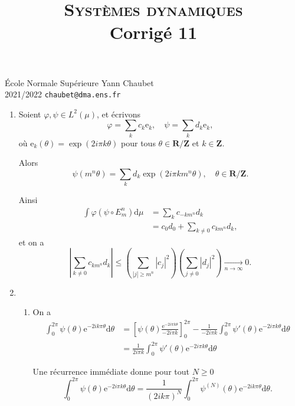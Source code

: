 \documentclass[a4paper,12pt,openany]{article}
\title{\textsc{Syst\`emes dynamiques} \\ Corrig\'e 11}
\date{}
\author{}
\theoremstyle{plain}
\theoremstyle{definition}
\newcommand{\e}{\mathrm{e}}
\newcommand{\dd}{\mathrm{d}}
\newcommand{\R}{\mathbf{R}}
\newcommand{\Z}{\mathbf{Z}}
\begin{document}
{\noindent \'Ecole Normale Sup\'erieure  \hfill Yann Chaubet } \\
{2021/2022 \hfill \texttt{chaubet@dma.ens.fr}}

{\let\newpage\relax\maketitle}
\maketitle

 \vspace{1.5mm} 

\begin{enumerate}
\item Soient $\varphi, \psi \in L^2(\mu)$, et \'ecrivons
$$
\varphi = \sum_{k} c_k \e_k, \quad \psi = \sum_k d_k \e_k,
$$
o\`u $\e_k(\theta) = \exp(2i\pi k \theta)$ pour tous $\theta \in \R/\Z$ et $k \in \Z.$
 

Alors
$$
\psi(m^n\theta) = \sum_k d_k \exp(2i\pi k m^n\theta), \quad \theta \in \R/\Z.
$$

Ainsi 
$$
\begin{aligned}
\int \varphi (\psi \circ E_m^n) \dd \mu &= \sum_k c_{-km^n} d_k \\
&= c_0 d_0 + \sum_{k \neq 0} c_{km^n} d_k, 
\end{aligned}
$$
et on a 
$$
\left| \sum_{k \neq 0} c_{km^n} d_k\right| \leqslant \left(\sum_{|j|\geqslant m^n}|c_j|^2 \right) \left(\sum_{j\neq0} |d_j|^2\right) \underset{n \to \infty}{\longrightarrow} 0.
$$

\item 
\begin{enumerate}
\item On a 
$$
\begin{aligned}
\int_0^{2\pi} \psi(\theta) \e^{-2ik\pi \theta} \dd \theta  &= \left[\psi(\theta) \frac{\e^{-2i\pi k\theta}}{-2i\pi k}\right]_0^{2\pi} - \frac{1}{-2i\pi k} \int_{0}^{2\pi} \psi'(\theta) \e^{-2i\pi k \theta}\dd \theta  \\
&= \frac{1}{2i \pi k } \int_0^{2\pi} \psi'(\theta) \e^{-2i\pi k \theta} \dd \theta
\end{aligned}
$$

Une r\'ecurrence imm\'ediate donne pour tout $N \geqslant 0$
$$
\int_0^{2\pi} \psi(\theta)\e^{-2i \pi k \theta} \dd \theta = \frac{1}{(2i k \pi)^N} \int_0^{2\pi} \psi^{(N)}(\theta)\e^{-2ik\pi\theta}\dd \theta.
$$


\end{enumerate}
\end{enumerate}
\end{document}
